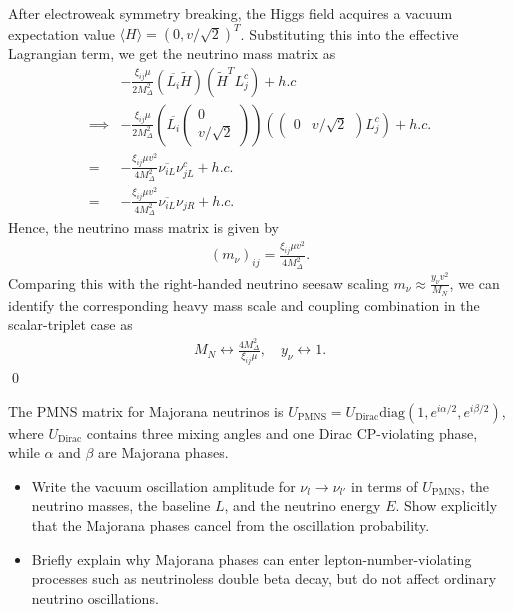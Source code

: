 After electroweak symmetry breaking, the Higgs field acquires a vacuum expectation value $\langle H \rangle = (0, v/\sqrt{2})^T$. Substituting this into the effective Lagrangian term, we get the neutrino mass matrix as
\begin{align}
    &- \frac{\xi_{ij} \mu}{2 M_\Delta^2} (\overline{L_i}\tilde{H})(\tilde{H}^T L_j^c) + h.c \\
    \implies & - \frac{\xi_{ij} \mu}{2 M_\Delta^2} \left(\overline{L_i}\begin{pmatrix}0\\
v/\sqrt{2}\end{pmatrix}\right) \left(\begin{pmatrix}0 & v/\sqrt{2}\end{pmatrix} L_j^c\right) + h.c.\\
    =& - \frac{\xi_{ij} \mu v^2}{4 M_\Delta^2} \overline{\nu_{iL}} \nu_{jL}^c + h.c.\\
    =& - \frac{\xi_{ij} \mu v^2}{4 M_\Delta^2} \overline{\nu_{iL}} \nu_{jR} + h.c.
\end{align}
Hence, the neutrino mass matrix is given by
\begin{align}
    (m_\nu)_{ij} = \frac{\xi_{ij} \mu v^2}{4 M_\Delta^2}.
\end{align}
Comparing this with the right-handed neutrino seesaw scaling $m_\nu\approx\frac{y_\nu v^2}{M_N}$, we can identify the corresponding heavy mass scale and coupling combination in the scalar-triplet case as
\begin{align}
    M_N \leftrightarrow \frac{4 M_\Delta^2}{\xi_{ij} \mu}, \quad y_\nu \leftrightarrow 1.
\end{align}
\qed






\clearpage
{}

The PMNS matrix for Majorana neutrinos is $U_\text{PMNS}=U_\text{Dirac}\text{diag}(1,e^{i\alpha/2},e^{i\beta/2})$, where $U_\text{Dirac}$ contains three mixing angles and one Dirac CP-violating phase, while $\alpha$ and $\beta$ are Majorana phases.
\begin{itemize}
    \item [(a)] Write the vacuum oscillation amplitude for $\nu_l\to\nu_{l'}$ in terms of $U_\text{PMNS}$, the neutrino masses, the baseline $L$, and the neutrino energy $E$. Show explicitly that the Majorana phases cancel from the oscillation probability.
    \item [(b)] Briefly explain why Majorana phases can enter lepton-number-violating processes such as neutrinoless double beta decay, but do not affect ordinary neutrino oscillations.
\end{itemize}


